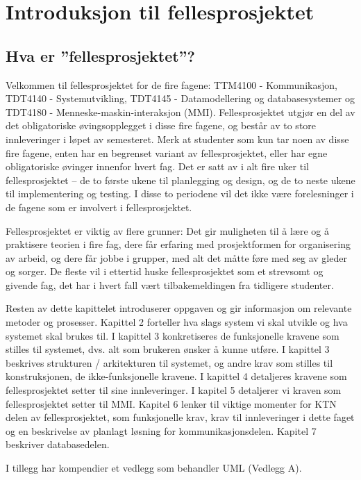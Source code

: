 \section{Introduksjon til fellesprosjektet}
\subsection{Hva er ”fellesprosjektet”?}

Velkommen til fellesprosjektet for de fire fagene: TTM4100 - Kommunikasjon, TDT4140 - Systemutvikling, TDT4145 - Datamodellering og databasesystemer og TDT4180 - Menneske-maskin-interaksjon (MMI). Fellesprosjektet utgjør en del av det obligatoriske øvingsopplegget i disse fire fagene, og består av to store innleveringer i løpet av semesteret. Merk at studenter som kun tar noen av disse fire fagene, enten har en begrenset variant av fellesprosjektet, eller har egne obligatoriske øvinger innenfor hvert fag. Det er satt av i alt fire uker til fellesprosjektet – de to første ukene til planlegging og design, og de to neste ukene til implementering og testing. I disse to periodene vil det ikke være forelesninger i de fagene som er involvert i fellesprosjektet. 

Fellesprosjektet er viktig av flere grunner: Det gir muligheten til å lære og å praktisere teorien i fire fag, dere får erfaring med prosjektformen for organisering av arbeid, og dere får jobbe i grupper, med alt det måtte føre med seg av gleder og sorger. De fleste vil i ettertid huske fellesprosjektet som et strevsomt og givende fag, det har i hvert fall vært tilbakemeldingen fra tidligere studenter. 

Resten av dette kapittelet introduserer oppgaven og gir informasjon om relevante metoder og prosesser. Kapittel 2 forteller hva slags system vi skal utvikle og hva systemet skal brukes til. I kapittel 3 konkretiseres de funksjonelle kravene som stilles til systemet, dvs. alt som brukeren ønsker å kunne utføre. I kapittel 3 beskrives strukturen / arkitekturen til systemet, og andre krav som stilles til konstruksjonen, de ikke-funksjonelle kravene. I kapittel 4 detaljeres kravene som fellesprosjektet setter til sine innleveringer. I kapitel 5 detaljerer vi kraven som fellesprosjektet setter til MMI. Kapitel 6 lenker til viktige momenter for KTN delen av fellesprosjektet, som funksjonelle krav, krav til innleveringer i dette faget og en beskrivelse av planlagt løsning for kommunikasjonsdelen. Kapitel 7 beskriver databasedelen. 

I tillegg har kompendier et vedlegg som behandler UML (Vedlegg A). 

